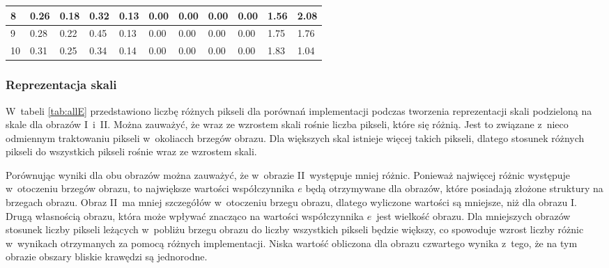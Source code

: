 {\begin{landscape}
\begin{table}[h]
\begin{tabular}{|p{0.8cm}|p{2cm}|p{2cm}|p{2cm}|p{2cm}|p{2cm}|p{2cm}|p{2cm}|p{2cm}|p{2cm}|p{2cm}|}
8        & 0.26                          & 0.18                           & 0.32              & 0.13             & 0.00                & 0.00                 & 0.00                  & 0.00                   & 1.56              & 2.08             \\ \hline
9        & 0.28                          & 0.22                           & 0.45              & 0.13             & 0.00                & 0.00                 & 0.00                  & 0.00                   & 1.75              & 1.76             \\ \hline
10       & 0.31                          & 0.25                           & 0.34              & 0.14             & 0.00                & 0.00                 & 0.00                  & 0.00                   & 1.83              & 1.04             \\ \hline
\end{tabular}
\end{table}
\end{landscape}}

\subsubsection{Reprezentacja skali}
\label{subsubsec:reprezentacjaSakliTabele}

W~tabeli \ref{tab:allE} przedstawiono liczbę różnych pikseli dla porównań implementacji podczas tworzenia reprezentacji skali podzieloną na skale dla obrazów I~i~II. Można zauważyć, że wraz ze wzrostem skali rośnie liczba pikseli, które się różnią. Jest to związane z~nieco odmiennym traktowaniu pikseli w~okoliacch brzegów obrazu. Dla większych skal istnieje więcej takich pikseli, dlatego stosunek różnych pikseli do wszystkich pikseli rośnie wraz ze wzrostem skali.

Porównując wyniki dla obu obrazów można zauważyć, że w~obrazie II~występuje mniej różnic. Ponieważ najwięcej różnic występuje w~otoczeniu brzegów obrazu, to największe wartości współczynnika $ e $ będą otrzymywane dla obrazów, które posiadają złożone struktury na brzegach obrazu. Obraz II~ma mniej szczegółów w~otoczeniu brzegu obrazu, dlatego wyliczone wartości są mniejsze, niż dla obrazu I. Drugą własnością obrazu, która może wpływać znacząco na wartości współczynnika $ e $~jest wielkość obrazu. Dla mniejszych obrazów stosunek liczby pikseli leżących w~pobliżu brzegu obrazu do liczby wszystkich pikseli będzie większy, co spowoduje wzrost liczby różnic w~wynikach otrzymanych za pomocą różnych implementacji. Niska wartość obliczona dla obrazu czwartego wynika z~tego, że na tym obrazie obszary bliskie krawędzi są jednorodne.

